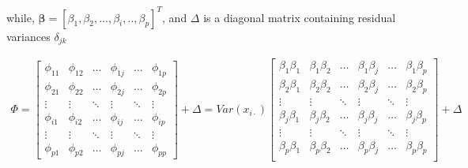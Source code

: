 \documentclass[letterpaper]{article}
\begin{document}
	while, \( \boldsymbol{\beta} = [\beta_{1}, \beta_{2}, ..., \beta_{i},.., \beta_{p}]^{T} \),  and \(\Delta\) is a diagonal matrix containing residual variances \(\delta_{jk} \)	
	
	\begin{align*} 
	\Phi =  
	\begin{bmatrix}
	\phi_{11}   & \phi_{12}  & \dots      & \phi_{1j}  & \dots       & \phi_{1p}  \\
	\phi_{21}   & \phi_{22}  & \dots      & \phi_{2j}  & \dots       & \phi_{2p}  \\
	\vdots      & \vdots     & \ddots     & \vdots	   & \ddots      & \vdots 	    \\
	\phi_{i1}   & \phi_{i2}  & \dots      & \phi_{ij}  & \dots       & \phi_{ip} 	\\
	\vdots      & \vdots     & \ddots     & \vdots	   & \ddots      & \vdots 	\\
	\phi_{p1}   & \phi_{p2}  & \dots      & \phi_{pj}  & \dots       & \phi_{pp}
	\end{bmatrix}
	+\Delta
	=
	{Var(x_{i\cdot})}
	\begin{bmatrix}
	\beta_1\beta_1 & \beta_1\beta_2 & \dots  & \beta_1\beta_j & \dots  & \beta_1\beta_p \\
	\beta_2\beta_1 & \beta_2\beta_2 & \dots  & \beta_2\beta_j & \dots  & \beta_2\beta_p \\
	\vdots         & \vdots         & \ddots & \vdots	      & \ddots & \vdots 	    \\
	\beta_j\beta_1 & \beta_j\beta_2 & \dots  & \beta_j\beta_j & \dots  & \beta_j\beta_p \\
	\vdots         & \vdots         & \ddots & \vdots	      & \ddots & \vdots 	    \\
	\beta_p\beta_1 & \beta_p\beta_2 & \dots  & \beta_p\beta_j & \dots  & \beta_p\beta_p \\
	\end{bmatrix}
	+\Delta
	\end{align*}
\end{document}
